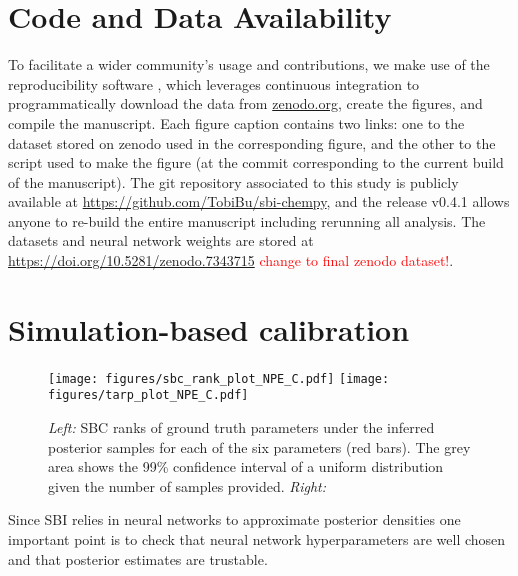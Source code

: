\documentclass{aa}
\begin{document}
\begin{appendix}

\section{Code and Data Availability}
\label{sec:appendix_code_and_data}

To facilitate a wider community's usage and contributions, we make use of the reproducibility software
\href{https://github.com/showyourwork/showyourwork}{\showyourwork}
\citep{Luger2021}, which leverages continuous integration to
programmatically download the data from
\href{https://zenodo.org/}{zenodo.org}, create the figures, and
compile the manuscript. Each figure caption contains two links: one
to the dataset stored on zenodo used in the corresponding figure,
and the other to the script used to make the figure (at the commit
corresponding to the current build of the manuscript). The git
repository associated to this study is publicly available at
\url{https://github.com/TobiBu/sbi-chempy}, and the release
v0.4.1 allows anyone to re-build the entire manuscript including rerunning all analysis. The datasets and neural network weights are stored at \url{https://doi.org/10.5281/zenodo.7343715} \textcolor{red}{change to final zenodo dataset!}.


\section{Simulation-based calibration}
\label{sec:sbc}

\begin{figure*}[]
     \centering
     \texttt{[image: figures/sbc\_rank\_plot\_NPE\_C.pdf]}
     \texttt{[image: figures/tarp\_plot\_NPE\_C.pdf]}
     \vspace{-.5cm}
     \caption{\emph{Left:} SBC ranks of ground truth parameters under the inferred posterior samples for each of the six parameters (red bars). The grey area shows the 99\% confidence interval of a uniform distribution given the number of samples provided. \emph{Right:} }
     \label{fig:sbc}
\end{figure*}

Since SBI relies in neural networks to approximate posterior densities one important point is to check that neural network hyperparameters are well chosen and that posterior estimates are trustable.


\end{appendix}
\end{document}
